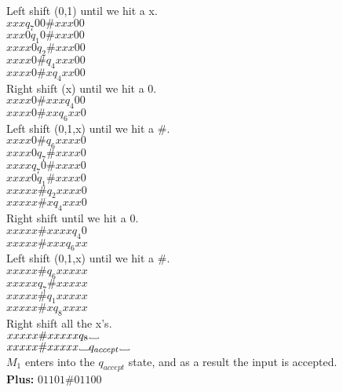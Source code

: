 \documentclass[12pt]{article}
\newcommand\Vtextvisiblespace[1][.8em]{%
	\mbox{\kern.07em\vrule height.3ex}%
	\vbox{\hrule width#1}%
	\hbox{\vrule height.3ex}}
\begin{document}
Left shift (0,1) until we hit a x.        \\
$xxx                  q_7    00 \# xxx00$ \\
$xxx0                 q_1     0 \# xxx00$ \\
$xxxx0                q_2       \# xxx00$ \\
$xxxx0 \#             q_4          xxx00$ \\
$xxxx0 \# x           q_4           xx00$ \\
Right shift (x) until we hit a 0.         \\
$xxxx0 \# xxx         q_4             00$ \\
$xxxx0 \# xx          q_6            xx0$ \\
Left shift (0,1,x) until we hit a $\#$.  \\
$xxxx0 \#             q_6            xxxx0$ \\
$xxxx0                q_7        \#  xxxx0$ \\
$xxxx                 q_7      0 \#  xxxx0$ \\
$xxxx0                q_1        \#  xxxx0$ \\
$xxxxx \#             q_2            xxxx0$ \\
$xxxxx \# x           q_4             xxx0$ \\
Right shift until we hit a 0. \\
$xxxxx \# xxxx        q_4                0$ \\
$xxxxx \# xxx         q_6               xx$ \\
Left shift (0,1,x) until we hit a $\#$. \\
$xxxxx \#             q_6            xxxxx$ \\
$xxxxx                q_7        \#  xxxxx$ \\
$xxxxx \#             q_1            xxxxx$ \\
$xxxxx \# x           q_8             xxxx$ \\
Right shift all the x's. \\
$xxxxx \# xxxxx       q_8  \Vtextvisiblespace    $ \\
$xxxxx \# xxxxx  \Vtextvisiblespace  q_{accept} \Vtextvisiblespace $ \\
$M_1$ enters into the $q_{accept}$ state, and as a result the input is accepted. \\

\pagebreak
\textbf{Plus:} $01101\#01100$ \\
\end{document}
